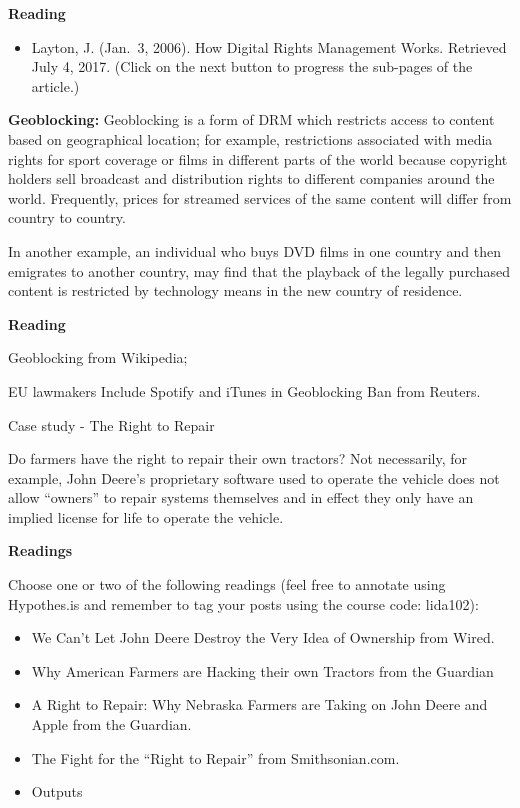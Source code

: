 \documentclass[
]{book}
\providecommand{\tightlist}{%
  \setlength{\itemsep}{0pt}\setlength{\parskip}{0pt}}
\theoremstyle{definition}
\theoremstyle{definition}
\theoremstyle{definition}
\theoremstyle{definition}
\theoremstyle{remark}
\begin{document}
\textbf{Reading}

\begin{itemize}
\tightlist
\item
  Layton, J. (Jan.~3, 2006). How Digital Rights Management Works. Retrieved July 4, 2017. (Click on the next button to progress the sub-pages of the article.)
\end{itemize}

\textbf{Geoblocking:} Geoblocking is a form of DRM which restricts access to content based on geographical location; for example, restrictions associated with media rights for sport coverage or films in different parts of the world because copyright holders sell broadcast and distribution rights to different companies around the world. Frequently, prices for streamed services of the same content will differ from country to country.

In another example, an individual who buys DVD films in one country and then emigrates to another country, may find that the playback of the legally purchased content is restricted by technology means in the new country of residence.

\textbf{Reading}

Geoblocking from Wikipedia;

EU lawmakers Include Spotify and iTunes in Geoblocking Ban from Reuters.

Case study - The Right to Repair

Do farmers have the right to repair their own tractors? Not necessarily, for example, John Deere's proprietary software used to operate the vehicle does not allow ``owners'' to repair systems themselves and in effect they only have an implied license for life to operate the vehicle.

\textbf{Readings}

Choose one or two of the following readings (feel free to annotate using Hypothes.is and remember to tag your posts using the course code: lida102):

\begin{itemize}
\tightlist
\item
  We Can't Let John Deere Destroy the Very Idea of Ownership from Wired.
\item
  Why American Farmers are Hacking their own Tractors from the Guardian\\
\item
  A Right to Repair: Why Nebraska Farmers are Taking on John Deere and Apple from the Guardian.\\
\item
  The Fight for the ``Right to Repair'' from Smithsonian.com.\\
\item
  Outputs
\end{itemize}
\end{document}

